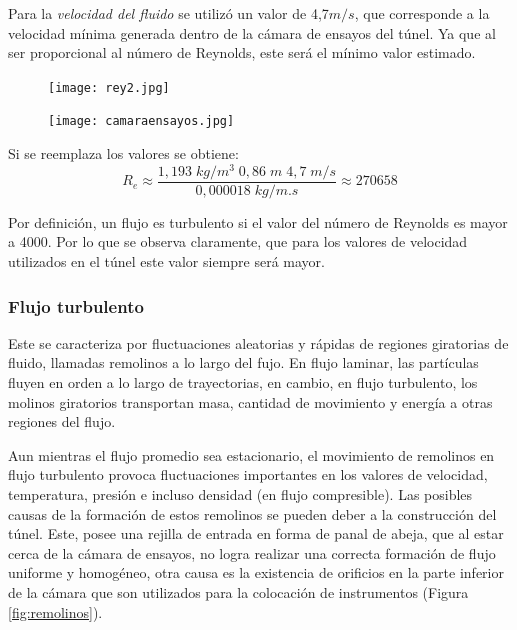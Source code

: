 Para la \textit{velocidad del fluido} se utilizó un valor de 4,7$m/s$, que corresponde a la velocidad mínima generada dentro de la cámara de ensayos del túnel. Ya que al ser proporcional al número de Reynolds, este será el mínimo valor estimado.

\begin{figure}[htb]
	\centering
	\texttt{[image: rey2.jpg]}
	\label{fig:rey2}
\end{figure}


\begin{figure}[htb]
	\centering
	\texttt{[image: camaraensayos.jpg]}
	\label{fig:camens}
\end{figure}

Si se reemplaza los valores se obtiene:
\begin{equation} 
	R_e\approx \frac{1,193\;kg/m^{3}\;0,86\;m\;4,7\;m/s}{0,000018\;kg/m.s}\approx 270658
	\label{reyn2}
\end{equation}	

Por definición, un flujo es turbulento si el valor del número de Reynolds es mayor a 4000. Por lo que se observa claramente, que para los valores de velocidad utilizados en el túnel este valor siempre será mayor.

\subsubsection{Flujo turbulento} \label{sec:flujoT}
\begin{tcolorbox}[colback=blue!5!white,colframe=blue!75!black,title=Flujo turbulento]
	Este se caracteriza por fluctuaciones aleatorias y rápidas de regiones giratorias de fluido, llamadas remolinos a lo largo del fujo. En flujo laminar, las partículas fluyen en orden a lo largo de trayectorias, en cambio, en flujo turbulento, los molinos giratorios transportan masa, cantidad de movimiento y energía a otras regiones del flujo. \cite{yunus2006mecanica}
	
\end{tcolorbox}

Aun mientras el flujo promedio sea estacionario, el movimiento de remolinos en flujo turbulento provoca fluctuaciones importantes en los valores de velocidad, temperatura, presión e incluso densidad (en flujo compresible). Las posibles causas de la formación de estos remolinos se pueden deber a la construcción del túnel. Este, posee una rejilla de entrada en forma de panal de abeja, que al estar cerca de la cámara de ensayos, no logra realizar una correcta formación de flujo uniforme y homogéneo, otra causa es la existencia de orificios en la parte inferior de la cámara que son utilizados para la colocación de instrumentos (Figura \ref{fig:remolinos}).


